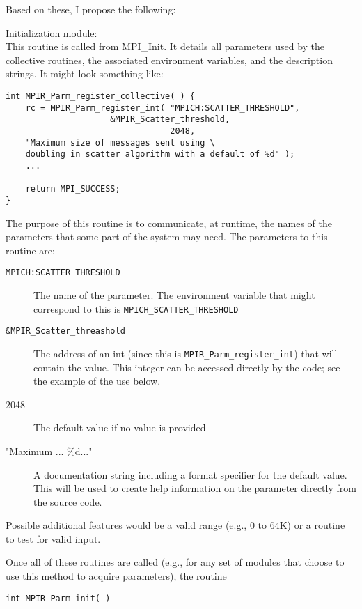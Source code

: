 \documentclass{report}
\begin{document}
Based on these, I propose the following:

Initialization module:\\
This routine is called from MPI\_Init.  It details all parameters used
by the collective routines, the associated environment variables, and
the description strings.  It might look something like:

\begin{verbatim}
int MPIR_Parm_register_collective( ) {
    rc = MPIR_Parm_register_int( "MPICH:SCATTER_THRESHOLD", 
			         &MPIR_Scatter_threshold, 
                                 2048,
    "Maximum size of messages sent using \
    doubling in scatter algorithm with a default of %d" );
    ...

    return MPI_SUCCESS;
}
\end{verbatim}

The purpose of this routine is to communicate, at runtime, the names
of the parameters that some part of the system may need.  The
parameters to this routine are:
\begin{description}
\item[\texttt{MPICH:SCATTER\_THRESHOLD}]The name of the parameter.  The
    environment variable that might correspond to this is
    \texttt{MPICH\_SCATTER\_THRESHOLD}

\item[\texttt{\&MPIR\_Scatter\_threashold}]The address of an int (since this is
  \texttt{MPIR\_Parm\_register\_int}) that will contain the value.
  This integer can be accessed directly by the code; see the example of the use
    below.

\item[2048]The default value if no value is provided

\item["Maximum ... \%d..."]A documentation string including a format
    specifier for the default value.  This will be used to create
    help information on the parameter directly from the source code.
\end{description}
Possible additional features would be a valid range (e.g., 0 to 64K)
or a routine to test for valid input.

Once all of these routines are called (e.g., for any set of modules
that choose to use this method to acquire parameters), the routine

\begin{verbatim}
int MPIR_Parm_init( )
\end{verbatim}
\end{document}
